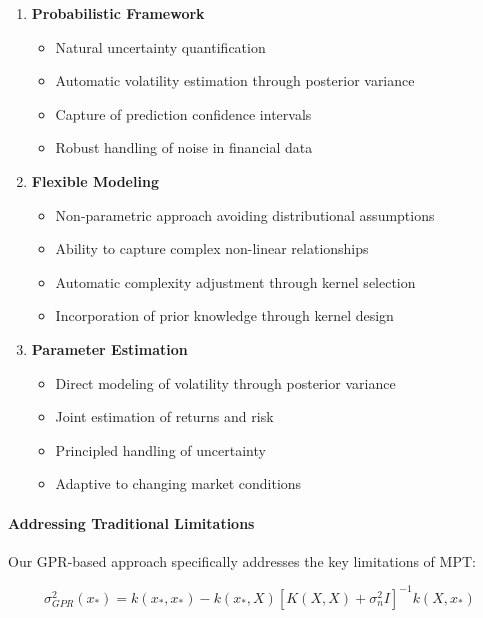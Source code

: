 \begin{enumerate}
    \item \textbf{Probabilistic Framework}
    \begin{itemize}
        \item Natural uncertainty quantification
        \item Automatic volatility estimation through posterior variance
        \item Capture of prediction confidence intervals
        \item Robust handling of noise in financial data
    \end{itemize}

    \item \textbf{Flexible Modeling}
    \begin{itemize}
        \item Non-parametric approach avoiding distributional assumptions
        \item Ability to capture complex non-linear relationships
        \item Automatic complexity adjustment through kernel selection
        \item Incorporation of prior knowledge through kernel design
    \end{itemize}

    \item \textbf{Parameter Estimation}
    \begin{itemize}
        \item Direct modeling of volatility through posterior variance
        \item Joint estimation of returns and risk
        \item Principled handling of uncertainty
        \item Adaptive to changing market conditions
    \end{itemize}
\end{enumerate}

\paragraph{Addressing Traditional Limitations}
Our \ac{GPR}-based approach specifically addresses the key limitations of \ac{MPT}:

\begin{equation}
    \sigma_{GPR}^2(x_*) = k(x_*, x_*) - k(x_*, X)[K(X,X) + \sigma_n^2I]^{-1}k(X, x_*)
    \label{eq:gpr_variance}
\end{equation}


